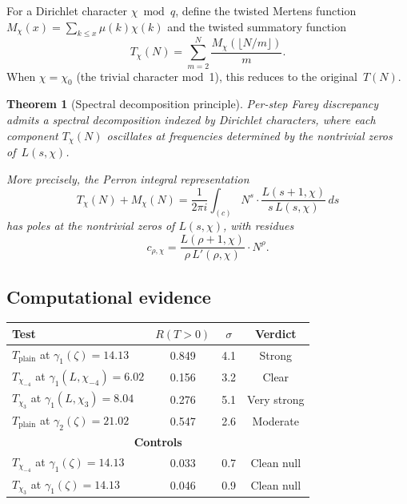 \documentclass[11pt]{article}
\newtheorem{theorem}{Theorem}[section]
\theoremstyle{definition}
\begin{document}
For a Dirichlet character $\chi \bmod q$, define the twisted Mertens
function $M_\chi(x) = \sum_{k \le x} \mu(k)\chi(k)$ and the twisted
summatory function
\begin{equation}\label{eq:T-chi}
  T_\chi(N) = \sum_{m=2}^{N} \frac{M_\chi(\lfloor N/m \rfloor)}{m}.
\end{equation}
When $\chi = \chi_0$ (the trivial character mod~1), this
reduces to the original~$T(N)$.

\begin{theorem}[Spectral decomposition principle]\label{thm:spectral-decomp}
Per-step Farey discrepancy admits a spectral decomposition indexed by
Dirichlet characters, where each component $T_\chi(N)$ oscillates at
frequencies determined by the nontrivial zeros of~$L(s,\chi)$.

More precisely, the Perron integral representation
\begin{equation}\label{eq:perron-chi}
  T_\chi(N) + M_\chi(N)
  = \frac{1}{2\pi i}\int_{(c)} N^s \cdot
  \frac{L(s{+}1,\chi)}{s\,L(s,\chi)}\,ds
\end{equation}
has poles at the nontrivial zeros of $L(s,\chi)$, with residues
\begin{equation}\label{eq:residue-chi}
  c_{\rho,\chi} = \frac{L(\rho{+}1,\chi)}{\rho\, L'(\rho,\chi)}
  \cdot N^\rho.
\end{equation}
\end{theorem}

\subsection{Computational evidence}

\begin{center}
\begin{tabular}{lccc}
\toprule
Test & $R(T{>}0)$ & $\sigma$ & Verdict \\
\midrule
$T_{\mathrm{plain}}$ at $\gamma_1(\zeta) = 14.13$ & 0.849 & 4.1 & Strong \\
$T_{\chi_{-4}}$ at $\gamma_1(L,\chi_{-4}) = 6.02$ & 0.156 & 3.2 & Clear \\
$T_{\chi_3}$ at $\gamma_1(L,\chi_3) = 8.04$ & 0.276 & 5.1 & Very strong \\
$T_{\mathrm{plain}}$ at $\gamma_2(\zeta) = 21.02$ & 0.547 & 2.6 & Moderate \\
\midrule
\multicolumn{4}{c}{\textbf{Controls}} \\
$T_{\chi_{-4}}$ at $\gamma_1(\zeta) = 14.13$ & 0.033 & 0.7 & Clean null \\
$T_{\chi_3}$ at $\gamma_1(\zeta) = 14.13$ & 0.046 & 0.9 & Clean null \\
\bottomrule
\end{tabular}
\end{center}
\end{document}
